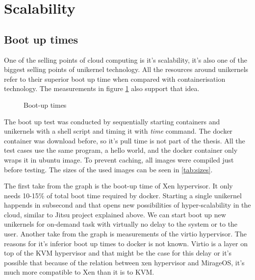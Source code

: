 \section{Scalability}

\subsection{Boot up times}
One of the selling points of cloud computing is it's scalability, it's also one of the biggest selling points of unikernel technology. All the resources around unikernels refer to their superior boot up time when compared with containerisation technology. The measurements in figure \ref{fig:boot-up} also support that idea. 
\begin{figure}[htpb]
  \centering
    \caption{Boot-up times}\label{fig:boot-up}
  \end{figure}

The boot up test was conducted by sequentially starting containers and unikernels with a shell script and timing it with \textit{time} command. The docker container was download before, so it's pull time is not part of the thesis. All the test cases use the same program, a hello world, and the docker container only wraps it in ubuntu image. To prevent caching, all images were compiled just before testing. The sizes of the used images can be seen in \ref{tab:sizes}.

The first take from the graph is the boot-up time of Xen hypervisor. It only needs 10-15\% of total boot time required by docker. Starting a single unikernel happends in subsecond and that opens new possibilities of hyper-scalability in the cloud, similar to Jitsu project explained above. We can start boot up new unikernels for on-demand task with virtually no delay to the system or to the user. Another take from the graph is measurements of the virtio\cite{virtio} hypervisor. The reasons for it's inferior boot up times to docker is not known. Virtio is a layer on top of the KVM hypervisor and that might be the case for this delay or it's possible that because of the relation between xen hypervisor and MirageOS, it's much more compatible to Xen than it is to KVM.

